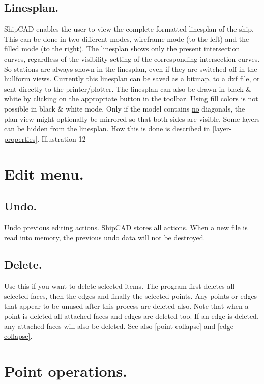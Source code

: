 \documentclass[12pt]{article}
\begin{document}
\subsection{Linesplan.}
ShipCAD enables the user to view the complete formatted linesplan of
the ship. This can be done in two different modes, wireframe mode (to
the left) and the filled mode (to the right). The linesplan shows only
the present intersection curves, regardless of the visibility setting
of the corresponding intersection curves. So stations are always shown
in the linesplan, even if they are switched off in the hullform
views. Currently this linesplan can be saved as a bitmap, to a dxf
file, or sent directly to the printer/plotter. The linesplan can also
be drawn in black \& white by clicking on the appropriate button in
the toolbar. Using fill colors is not possible in black \& white
mode. Only if the model contains \underline{no} diagonals, the plan view might
optionally be mirrored so that both sides are visible.  Some layers
can be hidden from the linesplan. How this is done is described in
\ref{layer-properties}.
Illustration 12

\section{Edit menu.}

\subsection{Undo.}
Undo previous editing actions. ShipCAD stores all actions. When a new
file is read into memory, the previous undo data will not be
destroyed.

\subsection{Delete.}
Use this if you want to delete selected items. The program first
deletes all selected faces, then the edges and finally the selected
points. Any points or edges that appear to be unused after this
process are deleted also. Note that when a point is deleted all
attached faces and edges are deleted too. If an edge is deleted, any
attached faces will also be deleted. See also \ref{point-collapse}
and \ref{edge-collapse}.

\section{Point operations.}
\end{document}
